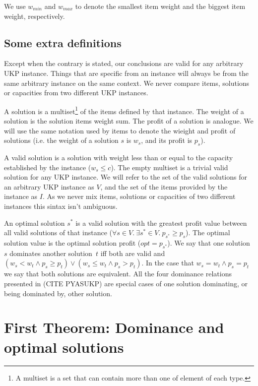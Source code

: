 \documentclass[12pt]{article}
\begin{document}
We use \(w_{min}\) and \(w_{max}\) to denote the smallest item weight and the biggest item weight, respectively.

\subsection{Some extra definitions}

Except when the contrary is stated, our conclusions are valid for any arbitrary UKP instance. Things that are specific from an instance will always be from the same arbitrary instance on the same context. We never compare items, solutions or capacities from two different UKP instances.

A solution is a multiset\footnote{A multiset is a set that can contain more than one of element of each type.} of the items defined by that instance. The weight of a solution is the solution items weight sum. The profit of a solution is analogue.  We will use the same notation used by items to denote the wieight and profit of solutions (i.e. the weight of a solution \(s\) is \(w_s\), and its profit is \(p_s\)).

A valid solution is a solution with weight less than or equal to the capacity established by the instance (\(w_s \leq c\)). The empty multiset is a trivial valid solution for any UKP instance. We will refer to the set of the valid solutions for an arbitrary UKP instance as \(V\), and the set of the items provided by the instance as \(I\). As we never mix items, solutions or capacities of two different instances this sintax isn't ambiguous.

An optimal solution \(s^*\) is a valid solution with the greatest profit value between all valid solutions of that instance (\(\forall s \in V.~\exists s^* \in V.~p_{s^*} \geq p_s\)). The optimal solution value is the optimal solution profit (\(opt = p_{s^*}\)). We say that one solution~\(s\) dominates another solution~\(t\) iff both are valid and \((w_s <  w_t \land p_s \geq p_t) \lor (w_s \leq w_t \land p_s > p_t)\). In the case that \(w_s = w_t \land p_s = p_t\) we say that both solutions are equivalent. All the four dominance relations presented in (CITE PYASUKP) are special cases of one solution dominating, or being dominated by, other solution.

\section{First Theorem: Dominance and optimal solutions}
\end{document}
